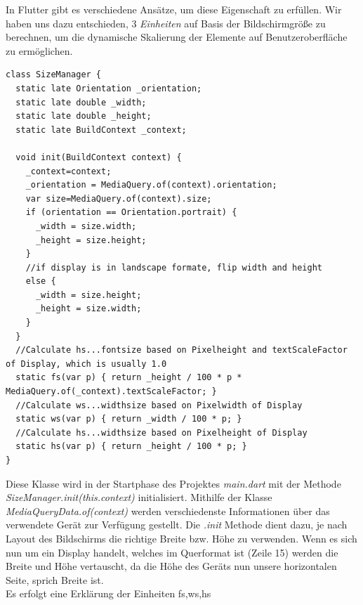 \label{subsec:responsivedesign}
In Flutter gibt es verschiedene Ansätze, um diese Eigenschaft zu erfüllen. Wir haben uns dazu entschieden, 3 {\textit{Einheiten}} auf Basis der Bildschirmgröße zu berechnen, um die dynamische Skalierung der Elemente auf Benutzeroberfläche zu ermöglichen.
\begin{lstlisting}[caption=SizeManager Klasse zur Berechnung der Skalierungswerte,style=goMono]
class SizeManager {
  static late Orientation _orientation;
  static late double _width;
  static late double _height;
  static late BuildContext _context;

  void init(BuildContext context) {
    _context=context;
    _orientation = MediaQuery.of(context).orientation;
    var size=MediaQuery.of(context).size;
    if (orientation == Orientation.portrait) {
      _width = size.width;
      _height = size.height;
    } 
    //if display is in landscape formate, flip width and height
    else {
      _width = size.height;
      _height = size.width;
    }
  }
  //Calculate hs...fontsize based on Pixelheight and textScaleFactor of Display, which is usually 1.0
  static fs(var p) { return _height / 100 * p * MediaQuery.of(_context).textScaleFactor; }
  //Calculate ws...widthsize based on Pixelwidth of Display
  static ws(var p) { return _width / 100 * p; }
  //Calculate hs...widthsize based on Pixelheight of Display
  static hs(var p) { return _height / 100 * p; }
}
\end{lstlisting}

\newpage

Diese Klasse wird in der Startphase des Projektes {\textit{main.dart}}  mit der Methode \textit{SizeManager.init(this.context)} initialisiert. Mithilfe der Klasse {\textit{MediaQueryData.of(context)}} werden verschiedenste Informationen über das verwendete Gerät zur Verfügung gestellt. Die {\textit{.init}} Methode dient dazu, je nach Layout des Bildschirms die richtige Breite bzw. Höhe zu verwenden. Wenn es sich nun um ein Display handelt, welches im Querformat ist (Zeile 15) werden die Breite und Höhe vertauscht, da die Höhe des Geräts nun unsere horizontalen Seite, sprich Breite ist.\\
Es erfolgt eine Erklärung der Einheiten fs,ws,hs 

